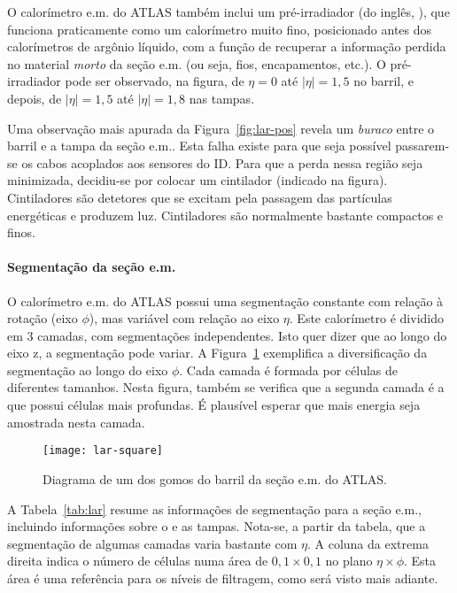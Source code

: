 O calo\-rí\-metro e.m. do ATLAS tam\-bém inclui um pré-irradiador (do inglês,
), que funciona praticamente como um calo\-rí\-metro muito
fino, posicionado antes dos calo\-rí\-metros de ar\-gô\-nio lí\-quido, com a
função de recuperar a informação perdida no material \textit{morto} da seção
e.m. (ou seja, fios, encapamentos, etc.). O pré-irradiador pode ser observado,
na figura, de $\eta=0$ até $|\eta|=1,5$ no barril, e depois, de $|\eta|=1,5$
até $|\eta|=1,8$ nas tampas.

Uma observação mais apurada da Figura~\ref{fig:lar-pos} revela um
\textit{buraco} entre o barril e a tampa da seção e.m.. Esta falha existe para
que seja possível passarem-se os cabos acoplados aos sensores do ID. Para que
a perda nessa região seja minimizada, decidiu-se por colocar um cintilador
(indicado na figura). Cintiladores são detetores que se excitam pela passagem
das partículas energéticas e produzem luz. Cintiladores são normalmente
bastante compactos e finos.

\paragraph{Segmentação da seção e.m.} O calorímetro e.m. do ATLAS possui
uma segmentação constante com relação à rotação (eixo $\phi$), mas variável
com relação ao eixo $\eta$. Este calorímetro é dividido em 3 camadas, com
segmentações independentes. Isto quer dizer que ao longo do eixo z, a
segmentação pode variar. A Figura~\ref{fig:lar-detail} exemplifica a
diversificação da segmentação ao longo do eixo $\phi$. Cada camada é formada
por células de diferentes tamanhos. Nesta figura, também se verifica que a
segunda camada é a que possui células mais profundas. É plausível esperar que
mais energia seja amostrada nesta camada.

\begin{figure}
\begin{center}
\texttt{[image: lar-square]}
\end{center}
\caption{Diagrama de um dos gomos do barril da seção e.m. do ATLAS.}
\label{fig:lar-detail}
\end{figure}

A Tabela~\ref{tab:lar} resume as informações de segmentação para a seção e.m.,
incluindo informações sobre o  e as tampas. Nota-se, a partir
da tabela, que a segmentação de algumas camadas varia bastante com $\eta$. A
coluna da extrema direita indica o número de células numa área de
$0,1\times0,1$ no plano $\eta\times\phi$. Esta área é uma referência para os
níveis de filtragem, como será visto mais adiante.

